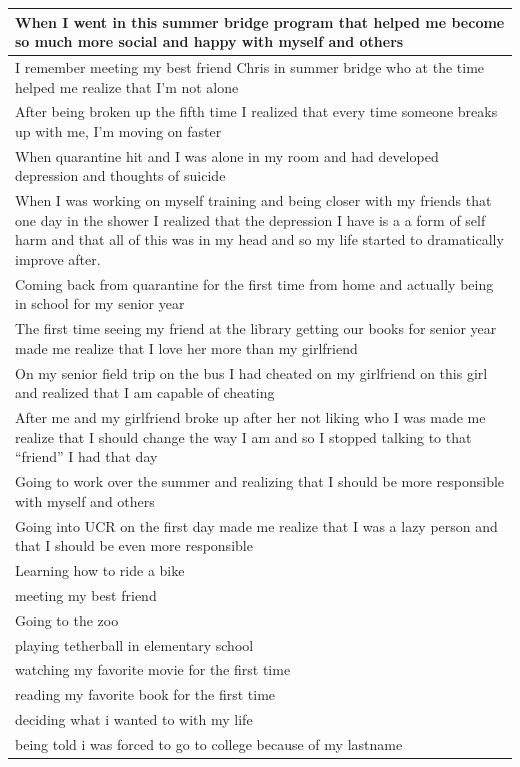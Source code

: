 \documentclass[
  .7em,
  letterpaper,
  DIV=11,
  numbers=noendperiod]{scrartcl}
\begin{document}
\begin{table}
\begin{tabular}{l}
When I went in this summer bridge program that helped me become so much more social and happy with myself and others\\
\hline
I remember meeting my best friend Chris in summer bridge who at the time helped me realize that I’m not alone\\
\hline
After being broken up the fifth time I realized that every time someone breaks up with me, I’m moving on faster\\
\hline
When quarantine hit and I was alone in my room and had developed depression and thoughts of suicide\\
\hline
When I was working on myself training and being closer with my friends that one day in the shower I realized that the depression I have is a a form of self harm and that all of this was in my head and so my life started to dramatically improve after.\\
\hline
Coming back from quarantine for the first time from home and actually being in school for my senior year\\
\hline
The first time seeing my friend  at the library getting our books for senior year made me realize that I love her more than my girlfriend\\
\hline
On my senior field trip on the bus I had cheated on my girlfriend on this girl and realized that I am capable of cheating\\
\hline
After me and my girlfriend broke up after her not liking who I was made me realize that I should change the way I am and so I stopped talking to that “friend” I had that day\\
\hline
Going to work over the summer and realizing that I should be more responsible with myself and others\\
\hline
Going into UCR on the first day made me realize that I was a lazy person and that I should be even more responsible\\
\hline
Learning how to ride a bike\\
\hline
meeting my best friend\\
\hline
Going to the zoo\\
\hline
playing tetherball in elementary school\\
\hline
watching my favorite movie for the first time\\
\hline
reading my favorite book for the first time\\
\hline
deciding what i wanted to with my life\\
\hline
being told i was forced to go to college because of my lastname\\

\end{tabular}
\end{table}
\end{document}
